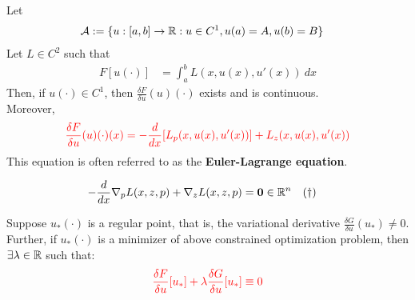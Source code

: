 \documentclass{article}
\begin{document}
    \begin{theorem}
        Let 
        \begin{align}
            \mathcal{{A}} &:=\{u:[a, b] \to \mathbb{R}:u \in C^1, u(a) = A, u(b) = B\}
        \end{align}
        Let $L \in C^2$ such that
        \begin{align}
            F[u(\cdot)] &= \int_a^b L(x, u(x), u'(x))\ dx
        \end{align}
        Then, if $u(\cdot) \in C^1$, then $\frac{\delta F}{\delta u}(u)(\cdot)$ exists and is continuous. \\
        Moreover,
        \begin{align}
            \textcolor{red}{\frac{\delta F}{\delta u}(u)(\cdot)(x) = - \frac{d}{dx} [L_p(x, u(x), u'(x))] + L_z(x, u(x), u'(x))}
        \end{align}
        This equation is often referred to as the \textbf{Euler-Lagrange  equation}.
    \end{theorem}

    \begin{theorem}
        \begin{align}
            - \frac{d}{dx} \nabla_p L(x, z, p) + \nabla_z L(x, z, p) &= \textbf{0} \in \mathbb{R}^n \quad (\dagger)
        \end{align}
    \end{theorem}

    \begin{theorem}
        Suppose $u_*(\cdot)$ is a regular point, that is, the variational derivative $\frac{\delta G}{\delta u}(u_*) \neq 0$.\\
        Further, if $u_*(\cdot)$ is a minimizer of above constrained optimization problem, then $\exists \lambda \in \mathbb{R}$ such that:
        \begin{align}
            \textcolor{red}{\frac{\delta F}{\delta u}[u_*] + \lambda \frac{\delta G}{\delta u}[u_*] \equiv 0}
        \end{align}
    \end{theorem}
\end{document}
